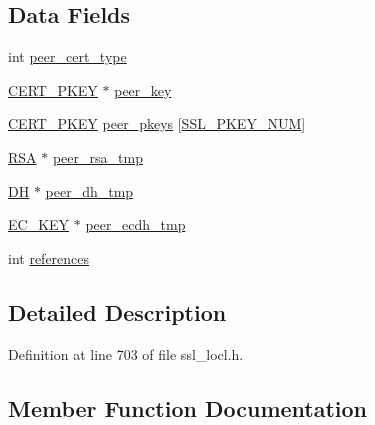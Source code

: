 \subsection*{Data Fields}
\begin{DoxyCompactItemize}
\item 
int \hyperlink{structsess__cert__st_a97dcaafe062fa43a3100d9ca667caabb}{peer\+\_\+cert\+\_\+type}
\item 
\hyperlink{ssl__locl_8h_ab376b10820d145fbabe4f4fdf0b3a770}{C\+E\+R\+T\+\_\+\+P\+K\+EY} $\ast$ \hyperlink{structsess__cert__st_aee246cac84569049594f00a7a520552f}{peer\+\_\+key}
\item 
\hyperlink{ssl__locl_8h_ab376b10820d145fbabe4f4fdf0b3a770}{C\+E\+R\+T\+\_\+\+P\+K\+EY} \hyperlink{structsess__cert__st_a8194372d542df4d91c9d64cc7c52a651}{peer\+\_\+pkeys} \mbox{[}\hyperlink{ssl__locl_8h_ae56b6c56e5819da2bf95a533238f69f8}{S\+S\+L\+\_\+\+P\+K\+E\+Y\+\_\+\+N\+UM}\mbox{]}
\item 
\hyperlink{crypto_2ossl__typ_8h_a9ad4496a11f0a9f686bea793cb97f8b5}{R\+SA} $\ast$ \hyperlink{structsess__cert__st_a7e64c1566d43df7d1e9faa4f68035cbb}{peer\+\_\+rsa\+\_\+tmp}
\item 
\hyperlink{crypto_2ossl__typ_8h_a5a5072cfe75a51d0ff201c0a8d2d68b2}{DH} $\ast$ \hyperlink{structsess__cert__st_ad70dd8bbf543fb59a41216f5c5d52a6a}{peer\+\_\+dh\+\_\+tmp}
\item 
\hyperlink{crypto_2ec_2ec_8h_a756878ae60b2fc17d4217e77ffe5e0d3}{E\+C\+\_\+\+K\+EY} $\ast$ \hyperlink{structsess__cert__st_a5087fbb55ccab7b8907440c4922ad118}{peer\+\_\+ecdh\+\_\+tmp}
\item 
int \hyperlink{structsess__cert__st_a146fdb34d9a909e530adf8b189481195}{references}
\end{DoxyCompactItemize}


\subsection{Detailed Description}


Definition at line 703 of file ssl\+\_\+locl.\+h.



\subsection{Member Function Documentation}

